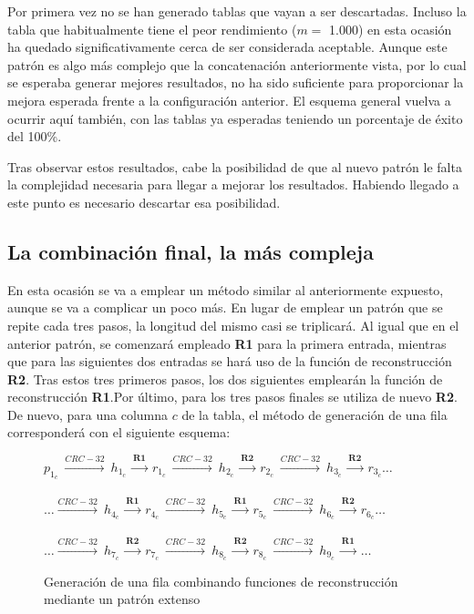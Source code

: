 \documentclass[12pt,spanish,listoffigures,listoftables]{tfgetsinf}
\begin{document}
Por primera vez no se han generado tablas que vayan a ser descartadas. Incluso la tabla que habitualmente tiene el peor rendimiento ($m =$ 1.000) en esta ocasión ha quedado significativamente cerca de ser considerada aceptable. Aunque este patrón es algo más complejo que la concatenación anteriormente vista, por lo cual se esperaba generar mejores resultados, no ha sido suficiente para proporcionar la mejora esperada frente a la configuración anterior. El esquema general vuelva a ocurrir aquí también, con las tablas ya esperadas teniendo un porcentaje de éxito del 100\%.

Tras observar estos resultados, cabe la posibilidad de que al nuevo patrón le falta la complejidad necesaria para llegar a mejorar los resultados. Habiendo llegado a este punto es necesario descartar esa posibilidad.

\subsection{La combinación final, la más compleja}

En esta ocasión se va a emplear un método similar al anteriormente expuesto, aunque se va a complicar un poco más. En lugar de emplear un patrón que se repite cada tres pasos, la longitud del mismo casi se triplicará. Al igual que en el anterior patrón, se comenzará empleado \textbf{R1} para la primera entrada, mientras que para las siguientes dos entradas se hará uso de la función de reconstrucción \textbf{R2}. Tras estos tres primeros pasos, los dos siguientes emplearán la función de reconstrucción \textbf{R1}.Por último, para los tres pasos finales se utiliza de nuevo \textbf{R2}. De nuevo, para una columna $c$ de la tabla, el método de generación de una fila corresponderá con el siguiente esquema:

\begin{figure}[H]
	
	\centering

	$p_{1_c}~ \xrightarrow{CRC-32}~ h_{1_c}~ \xrightarrow{\textbf{R1}}~ r_{1_c}~ \xrightarrow{CRC-32}~ h_{2_c}~ \xrightarrow{\textbf{R2}}~ r_{2_c}~ \xrightarrow{CRC-32}~ h_{3_c}~ \xrightarrow{\textbf{R2}}~ r_{3_c} \dots$ \\
	~\\
	$\dots \xrightarrow{CRC-32}~ h_{4_c}~ \xrightarrow{\textbf{R1}}~ r_{4_c}~ \xrightarrow{CRC-32}~ h_{5_c}~ \xrightarrow{\textbf{R1}}~ r_{5_c}~ \xrightarrow{CRC-32}~ h_{6_c}~ \xrightarrow{\textbf{R2}}~ r_{6_c} \dots$ \\
	~\\
	$\dots \xrightarrow{CRC-32}~ h_{7_c}~ \xrightarrow{\textbf{R2}}~ r_{7_c}~ \xrightarrow{CRC-32}~ h_{8_c}~ \xrightarrow{\textbf{R2}}~ r_{8_c}~ \xrightarrow{CRC-32}~ h_{9_c}~\xrightarrow{\textbf{R1}}~ \dots$\;\;\;\; \\

	\caption{Generación de una fila combinando funciones de reconstrucción mediante un patrón extenso}
	\label{filaPG}

\end{figure}
\end{document}
